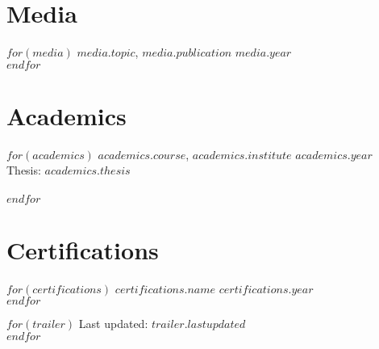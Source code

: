\documentclass[$fontsize$, a4paper]{article}
\begin{document}
\section*{Media}
$for(media)$
  $media.topic$, \href{$media.url$}{$media.publication$} \hfill $media.year$\\
$endfor$

\section*{Academics}
$for(academics)$
  $academics.course$, \href{$academics.url$}{$academics.institute$} \hfill $academics.year$\\
  Thesis: \href{$academics.thesis_url$}{$academics.thesis$}\\
  \\[.05cm]
$endfor$

\section*{Certifications}
$for(certifications)$
  \href{$certifications.url$}{$certifications.name$} \hfill $certifications.year$\\
$endfor$

\vspace{1cm}
$for(trailer)$
  Last updated: $trailer.lastupdated$\\
$endfor$
\end{document}
